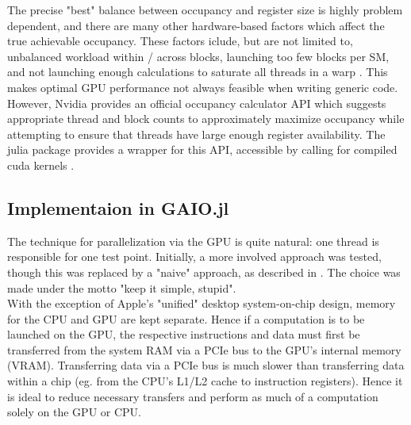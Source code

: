 The precise "best" balance between occupancy and register size is highly problem dependent, 
and there are many other hardware-based factors which affect the true achievable occupancy. 
These factors iclude, but are not limited to, unbalanced workload within / across blocks, 
launching too few blocks per SM, and not launching enough calculations to saturate all 
threads in a warp \cite*{occupancy}. 
This makes optimal GPU performance not always feasible when writing generic code. However, 
Nvidia provides an official occupancy calculator API \cite*{occupancycalc} which suggests 
appropriate thread and block counts to approximately maximize occupancy while attempting 
to ensure that threads have large enough register availability. The julia package 
 \cite*{cuda.jl} provides a wrapper for this API, accessible by calling 
 for compiled cuda kernels .


\subsection{Implementaion in GAIO.jl}

The technique for parallelization via the GPU is quite natural: one thread is responsible 
for one test point. Initially, a more involved approach was tested, though this 
was replaced by a "naive" approach, as described in \cite*{naivegpu,solvercomp}. The 
choice was made under the motto "keep it simple, stupid". \\

With the exception of Apple's "unified" desktop system-on-chip design, memory for the CPU 
and GPU are kept separate. Hence if a computation is to be launched on the GPU, the 
respective instructions and data must first be transferred from the system 
RAM via a PCIe bus to the GPU's internal memory (VRAM). Transferring data via a 
PCIe bus is much slower than transferring data within a chip (eg. from the CPU's L1/L2 
cache to instruction registers). Hence it is ideal to reduce necessary transfers and 
perform as much of a computation solely on the GPU or CPU. \\

